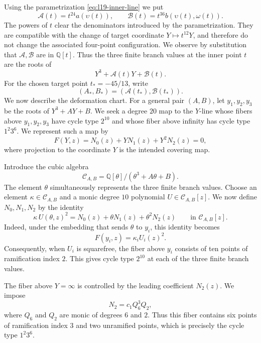 \documentclass[10pt]{amsart}
\numberwithin{equation}{section}
\theoremstyle{definition}
\theoremstyle{remark}
\newcommand{\Q}{\mathbb{Q}}
\begin{document}
  Using the parametrization \ref{eq:l19-inner-line} we put
  \begin{equation}
         \mathcal A(t)=t^{24}a(\upsilon(t)),
   \qquad
   \mathcal B(t)=t^{36}b(\upsilon(t),\omega(t)).
  \end{equation}
  The powers of $t$ clear the denominators introduced by the parametrization. They are compatible with the change of target coordinate
  $Y\mapsto t^{12}Y$, and therefore do not change the associated four-point
  configuration. We observe by substitution that $\mathcal A,\mathcal B$ are in $\Q[t]$. Thus the three finite branch values at the inner point $t$ are the roots of
  \[
   Y^3+\mathcal A(t)Y+\mathcal B(t).
  \]
  For the chosen target point $t_*=-45/13$, write
  \[
   (A_*,B_*)=(\mathcal A(t_*),\mathcal B(t_*)).
  \]
  We now describe the deformation chart.  For a general pair $(A,B)$, let
  $y_1,y_2,y_3$ be the roots of $Y^3+AY+B$. We seek a degree $20$ map to the $Y$-line whose fibers above $y_1,y_2,y_3$ have cycle type $2^{10}$ and whose fiber above infinity has cycle type $1^2 3^6$.  We represent such a map by
  \begin{equation}\label{eq:l19-target-equation}
   F(Y,z)=N_0(z)+YN_1(z)+Y^2N_2(z)=0,
  \end{equation}
  where projection to the coordinate $Y$ is the intended covering map.

  Introduce the cubic algebra
  \[
   \mathcal C_{A,B}
     =\Q[\theta]/(\theta^3+A\theta+B).
  \]
  The element $\theta$ simultaneously represents the three finite branch
  values.  Choose an element $\kappa\in\mathcal C_{A,B}$ and a monic
  degree $10$ polynomial $U\in\mathcal C_{A,B}[z]$. We now define
  $N_0,N_1,N_2$ by the identity 
  \begin{equation}\label{eq:l19-square-fibers}
   \kappa\,U(\theta,z)^2
     =N_0(z)+\theta N_1(z)+\theta^2N_2(z)
   \qquad\text{in }\mathcal C_{A,B}[z].
  \end{equation}
  Indeed, under the embedding that sends $\theta$ to $y_i$, this identity
  becomes
  \[
   F(y_i,z)=\kappa_i U_i(z)^2.
  \]
  Consequently, when $U_i$ is squarefree, the fiber above $y_i$ consists of
  ten points of ramification index $2$.  This gives cycle type $2^{10}$ at
  each of the three finite branch values.

  The fiber above $Y=\infty$ is controlled by the leading coefficient
  $N_2(z)$.  We impose
  \begin{equation}\label{eq:l19-order3}
   N_2=c_1Q_6^3Q_2,
  \end{equation}
  where $Q_6$ and $Q_2$ are monic of degrees $6$ and $2$.  Thus this fiber
  contains six points of ramification index $3$ and two unramified points,
  which is precisely the cycle type $1^2 3^6$.
\end{document}
